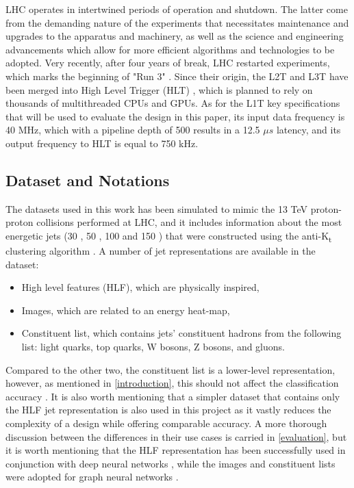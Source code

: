 LHC operates in intertwined periods of operation and shutdown. The latter come from the demanding nature of the experiments that necessitates maintenance and upgrades to the apparatus and machinery, as well as the science and engineering advancements which allow for more efficient algorithms and technologies to be adopted. Very recently, after four years of break, LHC restarted experiments, which marks the beginning of "Run 3" \cite{70-keanecern's}. Since their origin, the L2T and L3T have been merged into High Level Trigger (HLT) \citep[p.47]{49-tappertriggering}, which is planned to rely on thousands of multithreaded CPUs and GPUs. As for the L1T key specifications that will be used to evaluate the design in this paper, its input data frequency is 40 MHz, which with a pipeline depth of 500 results in a 12.5 \(\mu s\) latency, and its output frequency to HLT is equal to 750 kHz.

\subsection{Dataset and Notations}
The datasets used in this work has been simulated to mimic the 13 TeV proton-proton collisions performed at LHC, and it includes information about the most energetic jets \cite{61-coleman2018importance} (30 \cite{31-pierinihls4ml}, 50 \cite{32-pierinihls4ml}, 100 \cite{33-pierinihls4ml} and 150 \cite{34-pierinihls4ml}) that were constructed using the anti-K\textsubscript{t} clustering algorithm \cite{35-cacciari2008anti-kt}. A number of jet representations are available in the dataset:

\begin{itemize}
  \item High level features (HLF), which are physically inspired,
  \item Images, which are related to an energy heat-map,
  \item Constituent list, which contains jets' constituent hadrons from the following list: light quarks, top quarks, W bosons, Z bosons, and gluons.
\end{itemize}

Compared to the other two, the constituent list is a lower-level representation, however, as mentioned in \cref{introduction}, this should not affect the classification accuracy \cite{7-moore2019reports}. It is also worth mentioning that a simpler dataset that contains only the HLF jet representation \cite{36-kreinar2018fast} is also used in this project as it vastly reduces the complexity of a design while offering comparable accuracy. A more thorough discussion between the differences in their use cases is carried in \cref{evaluation}, but it is worth mentioning that the HLF representation has been successfully used in conjunction with deep neural networks \cite{53-kreinar2018fast}, while the images and constituent lists were adopted for graph neural networks \cite{9-newman2019jedi-net:}.

